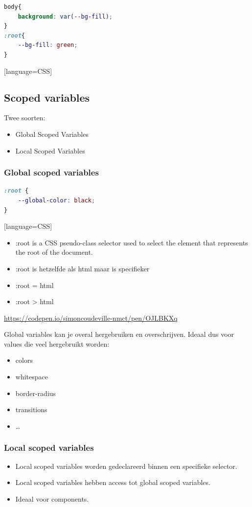 \documentclass{article}
\begin{document}
\begin{lstlisting}[language=CSS]
body{
    background: var(--bg-fill);
}
:root{
    --bg-fill: green;
}

\end{lstlisting}[language=CSS]

\subsection{Scoped variables}

Twee soorten:
\begin{itemize}
    \item Global Scoped Variables
    \item Local Scoped Variables
\end{itemize}

\subsubsection{Global scoped variables}

\begin{lstlisting}[language=CSS]
:root {
    --global-color: black;
}
\end{lstlisting}[language=CSS]
\begin{itemize}
    \item :root is a CSS pseudo-class selector used to select the element that represents the root of the document.
    \item :root is hetzelfde als html maar is specifieker
    \item :root = html
    \item :root > html
\end{itemize}

\url{https://codepen.io/simoncoudeville-nmct/pen/OJLBKXq}

Global variables kan je overal hergebruiken en overschrijven. Ideaal dus voor values die veel hergebruikt worden:

\begin{itemize}
    \item colors
    \item whitespace
    \item border-radius
    \item transitions
    \item \dots
\end{itemize}

\subsubsection{Local scoped variables}
\begin{itemize}
    \item Local scoped variables worden gedeclareerd binnen een specifieke selector.
    \item Local scoped variables hebben access tot global scoped variables.
    \item Ideaal voor components.
\end{itemize}
\end{document}
